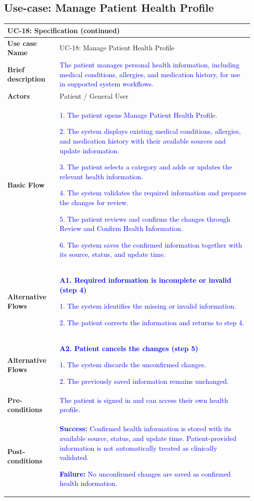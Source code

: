 \subsection{Use-case: Manage Patient Health Profile}
\label{uc:uc-18}
\begin{longtable}{|p{}|p{}|}
\hline
\endfirsthead
\multicolumn{2}{l}{\textbf{UC-18: Specification (continued)}}\\
\hline
\endhead
\textbf{Use case Name} &
UC-18: Manage Patient Health Profile
\\ \hline
\textbf{Brief description} &
\textcolor{blue}{The patient manages personal health information, including medical conditions, allergies, and medication history, for use in supported system workflows.}
\\ \hline
\textbf{Actors} & Patient / General User \\ \hline
\textbf{Basic Flow} &
\textcolor{blue}{1. The patient opens Manage Patient Health Profile.}\par
\textcolor{blue}{2. The system displays existing medical conditions, allergies, and medication history with their available sources and update information.}\par
\textcolor{blue}{3. The patient selects a category and adds or updates the relevant health information.}\par
\textcolor{blue}{4. The system validates the required information and prepares the changes for review.}\par
\textcolor{blue}{5. The patient reviews and confirms the changes through Review and Confirm Health Information.}\par
\textcolor{blue}{6. The system saves the confirmed information together with its source, status, and update time.}
\\ \hline
\textbf{Alternative Flows} &
\textcolor{blue}{\textbf{A1. Required information is incomplete or invalid (step 4)}}\par
\textcolor{blue}{1. The system identifies the missing or invalid information.}\par
\textcolor{blue}{2. The patient corrects the information and returns to step 4.}
\\ \hline
\textbf{Alternative Flows} &
\textcolor{blue}{\textbf{A2. Patient cancels the changes (step 5)}}\par
\textcolor{blue}{1. The system discards the unconfirmed changes.}\par
\textcolor{blue}{2. The previously saved information remains unchanged.}
\\ \hline
\textbf{Pre-conditions} &
\textcolor{blue}{The patient is signed in and can access their own health profile.}
\\ \hline
\textbf{Post-conditions} &
\textcolor{blue}{\textbf{Success:} Confirmed health information is stored with its available source, status, and update time. Patient-provided information is not automatically treated as clinically validated.}\par
\textcolor{blue}{\textbf{Failure:} No unconfirmed changes are saved as confirmed health information.}
\\ \hline
\end{longtable}
